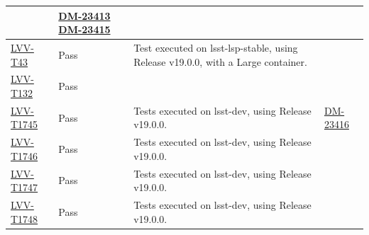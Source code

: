 \documentclass[DM,lsstdraft,STR,toc]{lsstdoc}
\begin{document}
\begin{longtable}{p{2cm}p{2.5cm}p{9cm}p{2.5cm}}
\begin{minipage}[]{9cm}
    \medskip
    \end{minipage}
    &
          \href{https://jira.lsstcorp.org/browse/DM-23413}{DM-23413}
          \href{https://jira.lsstcorp.org/browse/DM-23415}{DM-23415}
    \\\hline
\href{https://jira.lsstcorp.org/secure/Tests.jspa#/testCase/LVV-T43}{LVV-T43}
    & Pass &
    \begin{minipage}[]{9cm}
    \smallskip
     Test executed on lsst-lsp-stable, using Release v19.0.0, with a Large
container.

    \medskip
    \end{minipage}
    &
    \\\hline
\href{https://jira.lsstcorp.org/secure/Tests.jspa#/testCase/LVV-T132}{LVV-T132}
    & Pass &
    \begin{minipage}[]{9cm}
    \smallskip
    
    \medskip
    \end{minipage}
    &
    \\\hline
\href{https://jira.lsstcorp.org/secure/Tests.jspa#/testCase/LVV-T1745}{LVV-T1745}
    & Pass &
    \begin{minipage}[]{9cm}
    \smallskip
     Tests executed on lsst-dev, using Release v19.0.0.

    \medskip
    \end{minipage}
    &
          \href{https://jira.lsstcorp.org/browse/DM-23416}{DM-23416}
    \\\hline
\href{https://jira.lsstcorp.org/secure/Tests.jspa#/testCase/LVV-T1746}{LVV-T1746}
    & Pass &
    \begin{minipage}[]{9cm}
    \smallskip
     Tests executed on lsst-dev, using Release v19.0.0.

    \medskip
    \end{minipage}
    &
    \\\hline
\href{https://jira.lsstcorp.org/secure/Tests.jspa#/testCase/LVV-T1747}{LVV-T1747}
    & Pass &
    \begin{minipage}[]{9cm}
    \smallskip
     Tests executed on lsst-dev, using Release v19.0.0.

    \medskip
    \end{minipage}
    &
    \\\hline
\href{https://jira.lsstcorp.org/secure/Tests.jspa#/testCase/LVV-T1748}{LVV-T1748}
    & Pass &
    \begin{minipage}[]{9cm}
    \smallskip
     Tests executed on lsst-dev, using Release v19.0.0.


\end{minipage}
\end{longtable}
\end{document}
